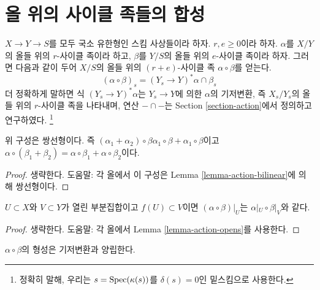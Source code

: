 \section{올 위의 사이클 족들의 합성}
\label{section-compose-families}

\noindent
$X \to Y \to S$를 모두 국소 유한형인 스킴 사상들이라 하자.
$r, e \geq 0$이라 하자. $\alpha$를 $X/Y$의 올들 위의 $r$-사이클
족이라 하고, $\beta$를 $Y/S$의 올들 위의 $e$-사이클 족이라 하자.
그러면 다음과 같이 두어 $X/S$의 올들 위의 $(r + e)$-사이클 족
$\alpha \circ \beta$를 얻는다.
$$
(\alpha \circ \beta)_s = (Y_s \to Y)^*\alpha \cap \beta_s
$$
더 정확하게 말하면 식 $(Y_s \to Y)^*\alpha$는 $Y_s \to Y$에 의한
$\alpha$의 기저변환, 즉 $X_s/Y_s$의 올들 위의 $r$-사이클 족을
나타내며, 연산 $- \cap -$는 Section \ref{section-action}에서 정의하고
연구하였다.
\footnote{정확히 말해, 우리는 $s = \mathop{\mathrm{Spec}}(\kappa(s))$를
$\delta(s) = 0$인 밑스킴으로 사용한다.}

\begin{lemma}
\label{lemma-construction-bilinear}
위 구성은 쌍선형이다. 즉
$(\alpha_1 + \alpha_2) \circ \beta \alpha_1 \circ \beta +
\alpha_1 \circ \beta$이고 $\alpha \circ (\beta_1 + \beta_2) =
\alpha \circ \beta_1 + \alpha \circ \beta_2$이다.
\end{lemma}

\begin{proof}
생략한다. 도움말: 각 올에서 이 구성은 Lemma
\ref{lemma-action-bilinear}에 의해 쌍선형이다.
\end{proof}

\begin{lemma}
\label{lemma-construction-opens}
$U \subset X$와 $V \subset Y$가 열린 부분집합이고
$f(U) \subset V$이면 $(\alpha \circ \beta)|_U$는
$\alpha|_U \circ \beta|_V$와 같다.
\end{lemma}

\begin{proof}
생략한다. 도움말: 각 올에서 Lemma \ref{lemma-action-opens}를 사용한다.
\end{proof}

\begin{lemma}
\label{lemma-construction-base-change}
$\alpha \circ \beta$의 형성은 기저변환과 양립한다.
\end{lemma}

